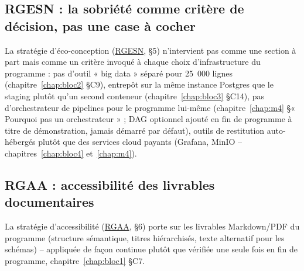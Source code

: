 \subsection{RGESN : la sobriété comme critère de décision, pas une case à cocher}

La stratégie d'éco-conception (\hyperref[gloss:rgesn]{RGESN},
 §5) n'intervient
pas comme une section à part mais comme un critère invoqué à chaque
choix d'infrastructure du programme : pas d'outil « big data » séparé
pour 25~000 lignes (chapitre~\ref{chap:bloc2} §C9), entrepôt sur la
même instance Postgres que le staging plutôt qu'un second conteneur
(chapitre~\ref{chap:bloc3} §C14), pas d'orchestrateur de pipelines pour
le programme lui-même (chapitre~\ref{chap:m4} §« Pourquoi pas un
orchestrateur » ; DAG optionnel ajouté en fin de programme à titre de
démonstration, jamais démarré par défaut), outils de
restitution auto-hébergés plutôt que des services cloud payants
(Grafana, MinIO -- chapitres~\ref{chap:bloc4} et~\ref{chap:m4}).

\subsection{RGAA : accessibilité des livrables documentaires}

La stratégie d'accessibilité (\hyperref[gloss:rgaa]{RGAA},
 §6) porte sur les
livrables Markdown/PDF du programme (structure sémantique, titres
hiérarchisés, texte alternatif pour les schémas) -- appliquée de
façon continue plutôt que vérifiée une seule fois en fin de
programme, chapitre~\ref{chap:bloc1} §C7.
